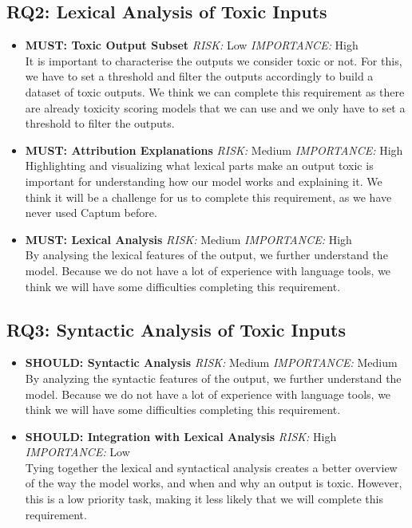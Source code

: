 \subsection{RQ2: Lexical Analysis of Toxic Inputs}
\begin{itemize}
    \item \textbf{MUST: Toxic Output Subset}
        \textit{RISK:} Low  \textit{IMPORTANCE:} High \\
        It is important to characterise the outputs we consider toxic or not. For this, we have to set a threshold and filter the outputs accordingly to build a dataset of toxic outputs. We think we can complete this requirement as there are already toxicity scoring models that we can use and we only have to set a threshold to filter the outputs.
    
    \item \textbf{MUST: Attribution Explanations} \textit{RISK:} Medium \textit{IMPORTANCE:} High \\
    Highlighting and visualizing what lexical parts make an output toxic is important for understanding how our model works and explaining it. We think it will be a challenge for us to complete this requirement, as we have never used Captum before.

    \item \textbf{MUST: Lexical Analysis}  \textit{RISK:} Medium  \textit{IMPORTANCE:} High \\ By analysing the lexical features of the output, we further understand the model.   Because we do not have a lot of experience with language tools, we think we will have some difficulties completing this requirement.
    
\end{itemize}

\subsection{RQ3: Syntactic Analysis of Toxic Inputs}

\begin{itemize}
    \item \textbf{SHOULD: Syntactic Analysis} \textit{RISK:} Medium  \textit{IMPORTANCE:} Medium  \\
    By analyzing the syntactic features of the output, we further understand the model. Because we do not have a lot of experience with language tools, we think we will have some difficulties completing this requirement.
    \item \textbf{SHOULD: Integration with Lexical Analysis} \textit{RISK:} High \textit{IMPORTANCE:} Low \\
    Tying together the lexical and syntactical analysis creates a better overview of the way the model works, and when and why an output is toxic. However, this is a low priority task, making it less likely that we will complete this requirement.
\end{itemize}